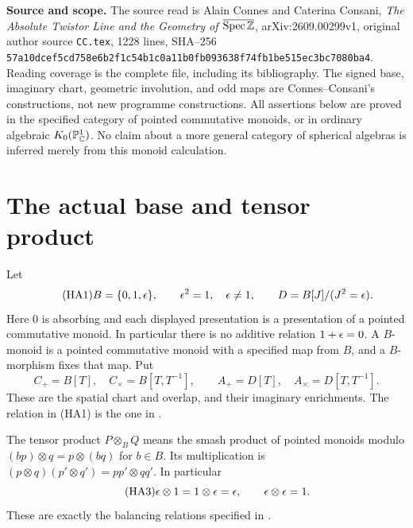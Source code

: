 


\noindent\textbf{Source and scope.}
The source read is Alain Connes and Caterina Consani, \emph{The Absolute
Twistor Line and the Geometry of $\overline{\operatorname{Spec}\mathbb Z}$},
arXiv:2609.00299v1, original author source \nolinkurl{CC.tex}, 1228 lines,
SHA--256
\nolinkurl{57a10dcef5cd758e6b2f1c54b1c0a11b0fb093638f74fb1be515ec3bc7080ba4}.
Reading coverage is the complete file, including its bibliography.
The signed base, imaginary chart, geometric involution, and odd maps are
Connes--Consani's constructions, not new programme constructions.
All assertions below are proved in the specified category of pointed
commutative monoids, or in ordinary algebraic $K_0(\mathbb P^1_\mathbb C)$.
No claim about a more general category of spherical algebras is inferred
merely from this monoid calculation.

\section{The actual base and tensor product}

Let
\begin{equation}\tag{HA1}
 B=\{0,1,\epsilon\},\qquad \epsilon^2=1,\quad \epsilon\ne1,
 \qquad D=B[J]/(J^2=\epsilon).
\end{equation}
Here $0$ is absorbing and each displayed presentation is a presentation
of a pointed commutative monoid. In particular there is no additive
relation $1+\epsilon=0$. A $B$-monoid is a pointed commutative monoid with a
specified map from $B$, and a $B$-morphism fixes that map. Put
\begin{equation}\tag{HA2}
 C_+=B[T],\quad C_\times=B[T,T^{-1}],\qquad
 A_+=D[T],\quad A_\times=D[T,T^{-1}].
\end{equation}
These are the spatial chart and overlap, and their imaginary enrichments.
The relation in (HA1) is the one in .

The tensor product $P\otimes_B Q$ means the smash product of pointed
monoids modulo $(bp)\otimes q=p\otimes(bq)$ for $b\in B$.
Its multiplication is
$(p\otimes q)(p'\otimes q')=pp'\otimes qq'$. In particular
\begin{equation}\tag{HA3}
 \epsilon\otimes1=1\otimes\epsilon=\epsilon,
 \qquad \epsilon\otimes\epsilon=1.
\end{equation}
These are exactly the balancing relations specified in
.

